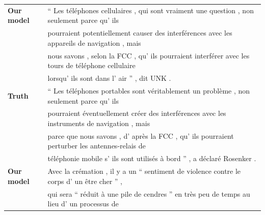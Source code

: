 \begin{table}[ht!]
\begin{footnotesize}
\begin{tabular}{|l|l|}
{\bf Our model} & 
`` Les t\'{e}l\'{e}phones cellulaires , qui sont vraiment une question , non seulement parce qu' ils \\
& pourraient potentiellement causer des interf\'{e}rences avec les appareils de navigation , mais \\
& nous savons , selon la FCC , qu' ils pourraient interf\'{e}rer avec les tours de t\'{e}l\'{e}phone cellulaire \\
& lorsqu' ils sont dans l' air '' , dit UNK .\\
\hline
{\bf Truth} & 
`` Les t\'{e}l\'{e}phones portables sont v\'{e}ritablement un probl\`{e}me , non seulement parce qu' ils \\
& pourraient \'{e}ventuellement cr\'{e}er des interf\'{e}rences avec les instruments de navigation , mais \\
& parce que nous savons , d' apr\`{e}s la FCC , qu' ils pourraient perturber les antennes-relais de \\
& t\'{e}l\'{e}phonie mobile s' ils sont utilis\'{e}s \`{a} bord '' , a d\'{e}clar\'{e} Rosenker .\\
\hline\hline
{\bf Our model} & 
Avec la cr\'{e}mation , il y a un `` sentiment de violence contre le corps d' un \^{e}tre cher '' , \\
& qui sera `` r\'{e}duit \`{a} une pile de cendres '' en tr\`{e}s peu de temps au lieu d' un processus de \\

\end{tabular}
\end{footnotesize}
\end{table}
